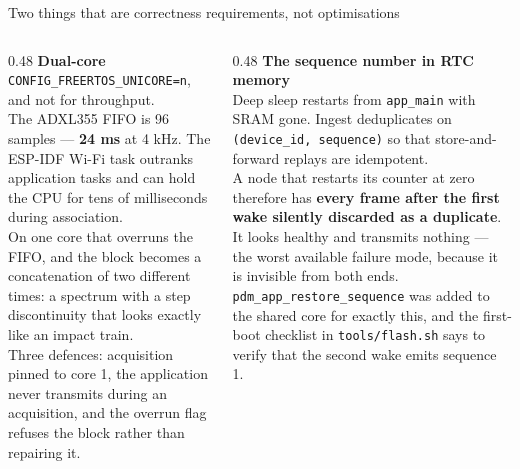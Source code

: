 \documentclass[aspectratio=169,10pt]{beamer}
\begin{document}
\begin{frame}{Two things that are correctness requirements, not optimisations}
  \begin{columns}[T]
    \begin{column}{0.48\textwidth}
      \small\textbf{Dual-core}
      \\[1.5mm]
      \scriptsize
      \texttt{CONFIG\_FREERTOS\_UNICORE=n}, and not for throughput.
      \\[1mm]
      The ADXL355 FIFO is 96 samples --- \textbf{24 ms} at 4 kHz. The ESP-IDF
      Wi-Fi task outranks application tasks and can hold the CPU for tens of
      milliseconds during association.
      \\[1mm]
      On one core that overruns the FIFO, and the block becomes a concatenation
      of two different times: a spectrum with a step discontinuity that looks
      exactly like an impact train.
      \\[1mm]
      Three defences: acquisition pinned to core 1, the application never
      transmits during an acquisition, and the overrun flag refuses the block
      rather than repairing it.
    \end{column}
    \begin{column}{0.48\textwidth}
      \small\textbf{The sequence number in RTC memory}
      \\[1.5mm]
      \scriptsize
      Deep sleep restarts from \texttt{app\_main} with SRAM gone. Ingest
      deduplicates on \texttt{(device\_id, sequence)} so that store-and-forward
      replays are idempotent.
      \\[1mm]
      A node that restarts its counter at zero therefore has \textbf{every frame
      after the first wake silently discarded as a duplicate}. It looks healthy
      and transmits nothing --- the worst available failure mode, because it is
      invisible from both ends.
      \\[1mm]
      \texttt{pdm\_app\_restore\_sequence} was added to the shared core for
      exactly this, and the first-boot checklist in \texttt{tools/flash.sh} says
      to verify that the second wake emits sequence 1.
    \end{column}
  \end{columns}
\end{frame}
\end{document}
